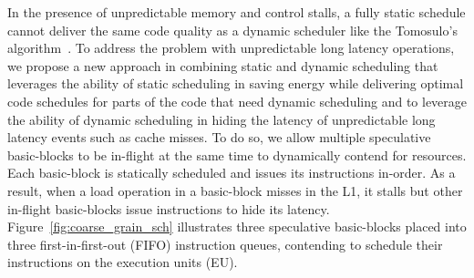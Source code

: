 In the presence of unpredictable memory and control stalls, a fully static
schedule cannot deliver the same code quality as a dynamic scheduler like the
Tomosulo's algorithm~\cite{tomasulo}. To address the problem with unpredictable
long latency operations, we propose a new approach in combining static and
dynamic scheduling that leverages the ability of static scheduling in saving
energy while delivering optimal code schedules for parts of the code that need
dynamic scheduling and to leverage the ability of dynamic scheduling in hiding
the latency of unpredictable long latency events such as cache misses. To do so,
    we allow multiple speculative basic-blocks to be in-flight at the same time
    to dynamically contend for resources.  Each basic-block is statically
    scheduled and issues its instructions in-order.  As a result, when a load
    operation in a basic-block misses in the L1, it stalls but other in-flight
    basic-blocks issue instructions to hide its latency.
    Figure~\ref{fig:coarse_grain_sch} illustrates three speculative basic-blocks
    placed into three first-in-first-out (FIFO) instruction queues, contending
    to schedule their instructions on the execution units (EU).

